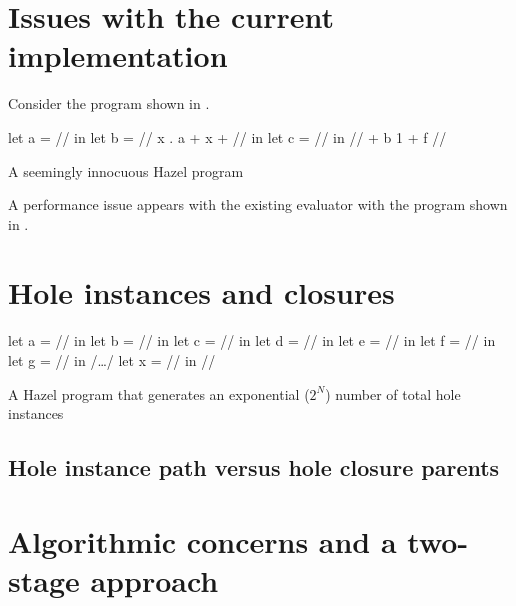 \section{Issues with the current implementation}
\label{sec:current-problems}

Consider the program shown in .

\begin{listing}
  \centering
  \begin{hminted}
let a = // in
let b = /\lbd/ x . { a + x + // } in
let c = // in
// + b 1 + f //
  \end{hminted}
  \caption{A seemingly innocuous Hazel program}
  \label{fig:sample_hazel_program}
\end{listing}

A performance issue appears with the existing evaluator with the program shown in .



\section{Hole instances and closures}
\label{sec:hole_instances_and_closures}

\begin{listing}
  \centering
  \begin{hminted}
let a = // in
let b = // in
let c = // in
let d = // in
let e = // in
let f = // in
let g = // in
/\dots/
let x = // in
//
  \end{hminted}
  \caption{A Hazel program that generates an exponential ($2^N$) number of total hole instances}
  \label{fig:hole_renumbering_problem}
\end{listing}

\subsection{Hole instance path versus hole closure parents}
\label{sec:closure-parents}



\section{Algorithmic concerns and a two-stage approach}
\label{sec:two-stage-renumber}

